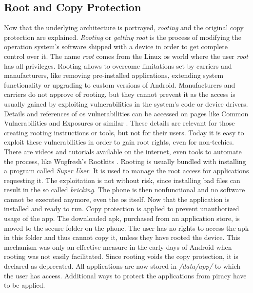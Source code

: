 \subsection{Root and Copy Protection} \label{subsection:android-copyroot}
Now that the underlying architecture is portrayed, \textit{rooting} and the original copy protection are explained.
\textit{Rooting} or \textit{getting root} is the process of modifying the operation system's software shipped with a device in order to get complete control over it.
The name \textit{root} comes from the Linux \gls{os} world where the user \textit{root} has all privileges.
Rooting allows to overcome limitations set by carriers and manufacturers, like removing pre-installed applications, extending system functionality or upgrading to custom versions of Android.
Manufacturers and carriers do not approve of rooting, but they cannot prevent it as the access is usually gained by exploiting vulnerabilities in the system's code or device drivers.
Details and references of \gls{os} vulnerabilities can be accessed on pages like Common Vulnerabilities and Exposures or similar \cite{cveAndroidPriv} \cite{cveDetails}.
These details are relevant for those creating rooting instructions or tools, but not for their users.
\newline
Today it is easy to exploit these vulnerabilities in order to gain root rights, even for non-techies.
There are videos and tutorials available on the internet, even tools to automate the process, like Wugfresh's Rootkits \cite{wugfresh}.
Rooting is usually bundled with installing a program called \textit{Super User}.
It is used to manage the root access for applications requesting it.
The exploitation is not without risk, since installing bad files can result in the so called \textit{bricking}.
The phone is then nonfunctional and no software cannot be executed anymore, even the \gls{os} itself.
 \cite{androidpoliceRoot}
\newline
Now that the application is installed and ready to run.
Copy protection is applied to prevent unauthorized usage of the app.
The downloaded \gls{apk}, purchased from an application store, is moved to the secure folder on the phone.
The user has no rights to access the \gls{apk} in this folder and thus cannot copy it, unless they have rooted the device.
This mechanism was only an effective measure in the early days of Android when rooting was not easily facilitated.
\newline
Since rooting voids the copy protection, it is declared as deprecated.
All applications are now stored in \textit{/data/app/} to which the user has access.
Additional ways to protect the applications from piracy have to be applied.
